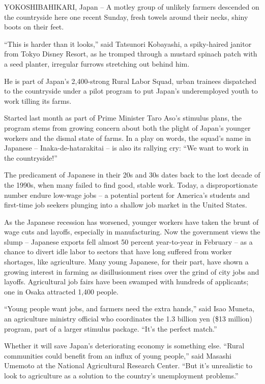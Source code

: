 \documentclass[12pt,a4paper,onecolumn]{article}
\begin{document}
YOKOSHIBAHIKARI, Japan -- A motley group of unlikely farmers descended on the countryside here one
recent Sunday, fresh towels around their necks, shiny boots on their feet.

``This is harder than it looks,'' said Tatsunori Kobayashi, a spiky-haired janitor from Tokyo Disney
Resort, as he tromped through a mustard spinach patch with a seed planter, irregular furrows
stretching out behind him.

He is part of Japan's 2,400-strong Rural Labor Squad, urban trainees dispatched to the countryside
under a pilot program to put Japan's underemployed youth to work tilling its farms.

Started last month as part of Prime Minister Taro Aso's stimulus plans, the program stems from
growing concern about both the plight of Japan's younger workers and the dismal state of farms. In a
play on words, the squad's name in Japanese -- Inaka-de-hatarakitai -- is also its rallying cry:
``We want to work in the countryside!''

The predicament of Japanese in their 20s and 30s dates back to the lost decade of the 1990s, when
many failed to find good, stable work. Today, a disproportionate number endure low-wage jobs -- a
potential portent for America's students and first-time job seekers plunging into a shallow job
market in the United States.

As the Japanese recession has worsened, younger workers have taken the brunt of wage cuts and
layoffs, especially in manufacturing. Now the government views the slump -- Japanese exports fell
almost 50 percent year-to-year in February -- as a chance to divert idle labor to sectors that have
long suffered from worker shortages, like agriculture. Many young Japanese, for their part, have
shown a growing interest in farming as disillusionment rises over the grind of city jobs and
layoffs. Agricultural job fairs have been swamped with hundreds of applicants; one in Osaka
attracted 1,400 people.

``Young people want jobs, and farmers need the extra hands,'' said Isao Muneta, an agriculture
ministry official who coordinates the 1.3 billion yen (\$13 million) program, part of a larger
stimulus package. ``It's the perfect match.''

Whether it will save Japan's deteriorating economy is something else. ``Rural communities could
benefit from an influx of young people,'' said Masashi Umemoto at the National Agricultural Research
Center. ``But it's unrealistic to look to agriculture as a solution to the country's unemployment
problems.''
\end{document}
